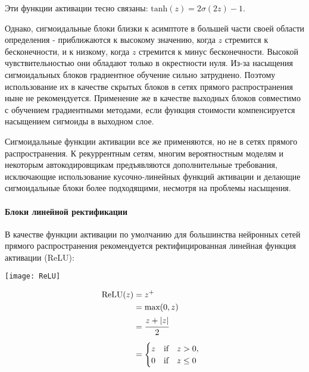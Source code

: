 Эти функции активации тесно связаны: $\text{tanh}(z) = 2 \sigma(2z) - 1$.

Однако, сигмоидальные блоки близки к асимптоте в большей части своей области определения -
приближаются к высокому значению, когда $z$ стремится к бесконечности, и к низкому,
когда $z$ стремится к минус бесконечности. Высокой чувствительностью они обладают 
только в окрестности нуля. Из-за насыщения сигмоидальных блоков градиентное
обучение сильно затруднено. Поэтому использование их в качестве скрытых блоков
в сетях прямого распространения ныне не рекомендуется. Применение же в качестве
выходных блоков совместимо с обучением градиентными методами, если функция
стоимости компенсируется насыщением сигмоиды в выходном слое.

Сигмоидальные функции активации все же применяются, но не в сетях прямого
распространения. К рекуррентным сетям, многим вероятностным моделям и некоторым 
автокодировщикам предъявляются дополнительные требования, исключающие
использование кусочно-линейных функций активации и делающие сигмоидальные
блоки более подходящими, несмотря на проблемы насыщения.

\paragraph{Блоки линейной ректификации}

В качестве функции активации по умолчанию для большинства нейронных сетей прямого 
распространения рекомендуется ректифицированная линейная функция активации (ReLU):

\begin{minipage}{0.45\textwidth}
    \texttt{[image: ReLU]}
    \label{fig:ReLU}
\end{minipage}
\hspace{30pt}
\begin{minipage}{0.2\textwidth}
    \begin{align*}
        \text{ReLU}(z) &= z^{+} \\
        &= \text{max}(0, z) \\
        &= \cfrac{z + |z|}{2} \\[0.5em]
        &= \begin{cases}
            z \quad \text{if} \quad z > 0, \\
            0 \quad \text{if} \quad z \leq 0
        \end{cases}
    \end{align*}
\end{minipage}\\

